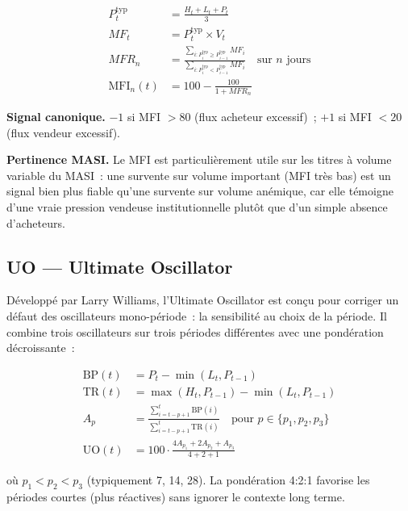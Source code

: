 \begin{align}
    P^{\text{typ}}_t &= \frac{H_t + L_t + P_t}{3} \label{eq:mfi_typ} \\[4pt]
    MF_t &= P^{\text{typ}}_t \times V_t \label{eq:mfi_mf} \\[4pt]
    MFR_n &= \frac{\sum_{i : P^{\text{typ}}_i \geq P^{\text{typ}}_{i-1}} MF_i}
                  {\sum_{i : P^{\text{typ}}_i < P^{\text{typ}}_{i-1}} MF_i}
    \quad \text{sur } n \text{ jours} \label{eq:mfi_mfr} \\[4pt]
    \text{MFI}_n(t) &= 100 - \frac{100}{1 + MFR_n}
    \label{eq:mfi}
\end{align}

\textbf{Signal canonique.}
$-1$ si MFI $> 80$ (flux acheteur excessif)~;
$+1$ si MFI $< 20$ (flux vendeur excessif).

\textbf{Pertinence MASI.}
Le MFI est particulièrement utile sur les titres à volume variable du MASI~: une
survente sur volume important (MFI très bas) est un signal bien plus fiable qu'une
survente sur volume anémique, car elle témoigne d'une vraie pression vendeuse
institutionnelle plutôt que d'un simple absence d'acheteurs.

\subsection{UO — Ultimate Oscillator}

Développé par Larry Williams, l'Ultimate Oscillator est conçu pour corriger un défaut
des oscillateurs mono-période~: la sensibilité au choix de la période. Il combine
trois oscillateurs sur trois périodes différentes avec une pondération décroissante~:

\begin{align}
    \text{BP}(t)  &= P_t - \min(L_t, P_{t-1}) \label{eq:uo_bp} \\[4pt]
    \text{TR}(t)  &= \max(H_t, P_{t-1}) - \min(L_t, P_{t-1}) \label{eq:uo_tr} \\[4pt]
    A_{p}         &= \frac{\sum_{i=t-p+1}^{t} \text{BP}(i)}{\sum_{i=t-p+1}^{t} \text{TR}(i)}
    \quad \text{pour } p \in \{p_1, p_2, p_3\} \label{eq:uo_avg} \\[4pt]
    \text{UO}(t)  &= 100 \cdot \frac{4 A_{p_1} + 2 A_{p_2} + A_{p_3}}{4 + 2 + 1}
    \label{eq:uo}
\end{align}

où $p_1 < p_2 < p_3$ (typiquement 7, 14, 28). La pondération 4:2:1 favorise les
périodes courtes (plus réactives) sans ignorer le contexte long terme.

